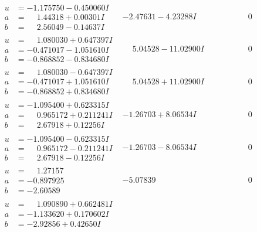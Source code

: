 \documentclass[1p]{elsarticle_modified}
\theoremstyle{definition}
\begin{document}
$$\begin{array}{c|c|c}
\begin{aligned}
u &= -1.175750 - 0.450060 I \\
a &= \phantom{-}1.44318 + 0.00301 I \\
b &= \phantom{-}2.56049 - 0.14637 I\end{aligned}
 & -2.47631 - 4.23288 I & \phantom{-0.000000 } 0 \\ \hline\begin{aligned}
u &= \phantom{-}1.080030 + 0.647397 I \\
a &= -0.471017 - 1.051610 I \\
b &= -0.868852 - 0.834680 I\end{aligned}
 & \phantom{-}5.04528 - 11.02900 I & \phantom{-0.000000 } 0 \\ \hline\begin{aligned}
u &= \phantom{-}1.080030 - 0.647397 I \\
a &= -0.471017 + 1.051610 I \\
b &= -0.868852 + 0.834680 I\end{aligned}
 & \phantom{-}5.04528 + 11.02900 I & \phantom{-0.000000 } 0 \\ \hline\begin{aligned}
u &= -1.095400 + 0.623315 I \\
a &= \phantom{-}0.965172 + 0.211241 I \\
b &= \phantom{-}2.67918 + 0.12256 I\end{aligned}
 & -1.26703 + 8.06534 I & \phantom{-0.000000 } 0 \\ \hline\begin{aligned}
u &= -1.095400 - 0.623315 I \\
a &= \phantom{-}0.965172 - 0.211241 I \\
b &= \phantom{-}2.67918 - 0.12256 I\end{aligned}
 & -1.26703 - 8.06534 I & \phantom{-0.000000 } 0 \\ \hline\begin{aligned}
u &= \phantom{-}1.27157\phantom{ +0.000000I} \\
a &= -0.897925\phantom{ +0.000000I} \\
b &= -2.60589\phantom{ +0.000000I}\end{aligned}
 & -5.07839\phantom{ +0.000000I} & \phantom{-0.000000 } 0 \\ \hline\begin{aligned}
u &= \phantom{-}1.090890 + 0.662481 I \\
a &= -1.133620 + 0.170602 I \\
b &= -2.92856 + 0.42650 I\end{aligned}

\end{array}$$
\end{document}
